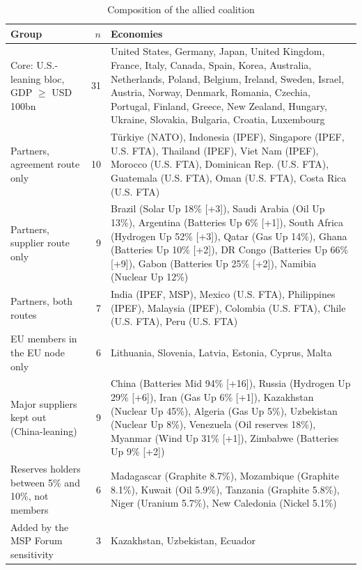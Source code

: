 \begin{table}[htbp]
\centering
\begin{threeparttable}
\caption{Composition of the allied coalition}
\label{tab:coalition_composition}
\footnotesize
\begin{tabularx}{\textwidth}{@{}>{\raggedright\arraybackslash}p{} r >{\raggedright\arraybackslash}X@{}}
\toprule
Group & $n$ & Economies \\
\midrule
Core: U.S.-leaning bloc, GDP $\geq$ USD 100bn & 31 & United States, Germany, Japan, United Kingdom, France, Italy, Canada, Spain, Korea, Australia, Netherlands, Poland, Belgium, Ireland, Sweden, Israel, Austria, Norway, Denmark, Romania, Czechia, Portugal, Finland, Greece, New Zealand, Hungary, Ukraine, Slovakia, Bulgaria, Croatia, Luxembourg \\
Partners, agreement route only & 10 & T\"urkiye (NATO), Indonesia (IPEF), Singapore (IPEF, U.S. FTA), Thailand (IPEF), Viet Nam (IPEF), Morocco (U.S. FTA), Dominican Rep. (U.S. FTA), Guatemala (U.S. FTA), Oman (U.S. FTA), Costa Rica (U.S. FTA) \\
Partners, supplier route only & 9 & Brazil (Solar Up 18\% [+3]), Saudi Arabia (Oil Up 13\%), Argentina (Batteries Up 6\% [+1]), South Africa (Hydrogen Up 52\% [+3]), Qatar (Gas Up 14\%), Ghana (Batteries Up 10\% [+2]), DR Congo (Batteries Up 66\% [+9]), Gabon (Batteries Up 25\% [+2]), Namibia (Nuclear Up 12\%) \\
Partners, both routes & 7 & India (IPEF, MSP), Mexico (U.S. FTA), Philippines (IPEF), Malaysia (IPEF), Colombia (U.S. FTA), Chile (U.S. FTA), Peru (U.S. FTA) \\
EU members in the EU node only & 6 & Lithuania, Slovenia, Latvia, Estonia, Cyprus, Malta \\
Major suppliers kept out (China-leaning) & 9 & China (Batteries Mid 94\% [+16]), Russia (Hydrogen Up 29\% [+6]), Iran (Gas Up 6\% [+1]), Kazakhstan (Nuclear Up 45\%), Algeria (Gas Up 5\%), Uzbekistan (Nuclear Up 8\%), Venezuela (Oil reserves 18\%), Myanmar (Wind Up 31\% [+1]), Zimbabwe (Batteries Up 9\% [+2]) \\
Reserves holders between 5\% and 10\%, not members & 6 & Madagascar (Graphite 8.7\%), Mozambique (Graphite 8.1\%), Kuwait (Oil 5.9\%), Tanzania (Graphite 5.8\%), Niger (Uranium 5.7\%), New Caledonia (Nickel 5.1\%) \\
Added by the MSP Forum sensitivity & 3 & Kazakhstan, Uzbekistan, Ecuador \\

\end{tabularx}
\end{threeparttable}
\end{table}
